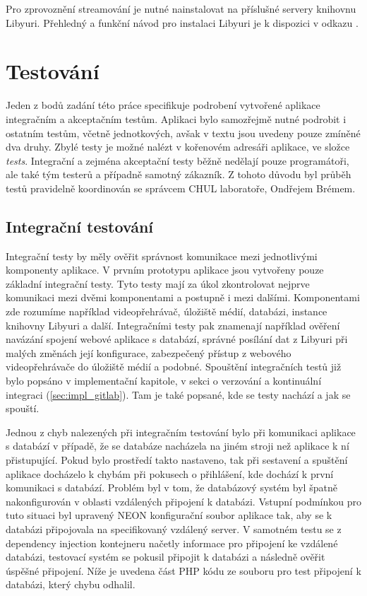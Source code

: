 \documentclass[thesis=M,czech]{FITthesis}[2012/06/26]
\begin{document}
Pro zprovoznění streamování je nutné nainstalovat na příslušné servery knihovnu Libyuri. Přehledný a funkční návod pro instalaci Libyuri je k dispozici v odkazu \cite{yuri}.

\chapter{Testování} \label{chap:testovani}
Jeden z bodů zadání této práce specifikuje podrobení vytvořené aplikace integračním a akceptačním testům. Aplikaci bylo samozřejmě nutné podrobit i ostatním testům, včetně jednotkových, avšak v textu jsou uvedeny pouze zmíněné dva druhy. Zbylé testy je možné nalézt v kořenovém adresáři aplikace, ve složce \textit{tests}. Integrační a zejména akceptační testy běžně nedělají pouze programátoři, ale také tým testerů a případně samotný zákazník. Z tohoto důvodu byl průběh testů pravidelně koordinován se správcem CHUL laboratoře, Ondřejem Brémem.
 
\section{Integrační testování} \label{sec:testovani_integracni}
Integrační testy by měly ověřit správnost komunikace mezi jednotlivými komponenty aplikace. V prvním prototypu aplikace jsou vytvořeny pouze základní integrační testy. Tyto testy mají za úkol zkontrolovat nejprve komunikaci mezi dvěmi komponentami a postupně i mezi dalšími. Komponentami zde rozumíme například videopřehrávač, úložiště médií, databázi, instance knihovny Libyuri a další. Integračními testy pak znamenají například ověření navázání spojení webové aplikace s databází, správné posílání dat z Libyuri při malých změnách její konfigurace, zabezpečený přístup z webového videopřehrávače do úložiště médií a podobné. Spouštění integračních testů již bylo popsáno v implementační kapitole, v sekci o verzování a kontinuální integraci (\ref{sec:impl_gitlab}). Tam je také popsané, kde se testy nachází a jak se spouští.

Jednou z chyb nalezených při integračním testování bylo při komunikaci aplikace s databází v případě, že se databáze nacházela na jiném stroji než aplikace k ní přistupující. Pokud bylo prostředí takto nastaveno, tak při sestavení a spuštění aplikace docházelo k chybám při pokusech o přihlášení, kde dochází k první komunikaci s databází. Problém byl v tom, že databázový systém byl špatně nakonfigurován v oblasti vzdálených připojení k databázi. Vstupní podmínkou pro tuto situaci byl upravený NEON konfigurační soubor aplikace tak, aby se k databázi připojovala na specifikovaný vzdálený server. V samotném testu se z dependency injection kontejneru načetly informace pro připojení ke vzdálené databázi, testovací systém se pokusil připojit k databázi a následně ověřit úspěšné připojení. Níže je uvedena část PHP kódu ze souboru pro test připojení k databázi, který chybu odhalil.\\
\end{document}
